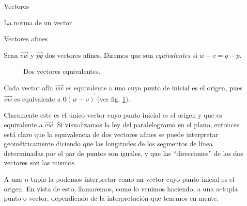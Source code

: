 \begin{chapter}{Vectores}
\begin{section}{La norma de un vector}
\begin{section}{Vectores afines}
        
        
        Sean $\overrightarrow{vw}$ y $\overrightarrow{pq}$ dos vectores afines. Diremos que son \textit{equivalentes} si $w-v= q-p$. 
        \begin{figure}[h]
        	\centering
            \caption{Dos vectores equivalentes.}
            \label{fig-vectores-equivalerntes}
        \end{figure}
        
        Cada vector afín $\overrightarrow{vw}$ es equivalente a uno cuyo punto de inicial es el origen, pues $\overrightarrow{vw}$ es equivalente a $\overrightarrow{0(w-v)}$ (ver fig. \ref{fig-vectores-equivalerntes}).
        
        Claramente este es el único vector cuyo punto inicial es el origen y que es equivalente a $\overrightarrow{vw}$. Si visualizamos la ley del paralelogramo en el plano, entonces está claro que la equivalencia de dos vectores afines se puede interpretar geométricamente diciendo que las longitudes de los segmentos de línea determinadas por el par de puntos son iguales, y que las ``direcciones'' de los dos vectores son las mismos. 
        
        A una $n$-tupla  la podemos interpretar como un  vector cuyo punto inicial es el origen. En vista de esto, llamaremos, como lo venimos haciendo,  a una $n$-tupla punto o vector, dependiendo de la interpretación que tenemos en mente.
        

\end{section}
\end{section}
\end{chapter}
